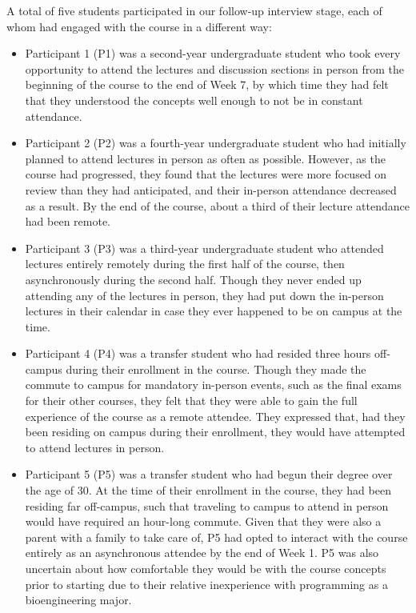 A total of five students participated in our follow-up interview stage, each of whom had engaged with the course in a different way:
\begin{itemize}
    \item Participant 1 (P1) was a second-year undergraduate student who took every opportunity to attend the lectures and discussion sections in person from the beginning of the course to the end of Week 7, by which time they had felt that they understood the concepts well enough to not be in constant attendance.
    \item Participant 2 (P2) was a fourth-year undergraduate student who had initially planned to attend lectures in person as often as possible. However, as the course had progressed, they found that the lectures were more focused on review than they had anticipated, and their in-person attendance decreased as a result. By the end of the course, about a third of their lecture attendance had been remote.
    \item Participant 3 (P3) was a third-year undergraduate student who attended lectures entirely remotely during the first half of the course, then asynchronously during the second half. Though they never ended up attending any of the lectures in person, they had put down the in-person lectures in their calendar in case they ever happened to be on campus at the time.
    \item Participant 4 (P4) was a transfer student who had resided three hours off-campus during their enrollment in the course. Though they made the commute to campus for mandatory in-person events, such as the final exams for their other courses, they felt that they were able to gain the full experience of the course as a remote attendee. They expressed that, had they been residing on campus during their enrollment, they would have attempted to attend lectures in person.
    \item Participant 5 (P5) was a transfer student who had begun their degree over the age of 30. At the time of their enrollment in the course, they had been residing far off-campus, such that traveling to campus to attend in person would have required an hour-long commute. Given that they were also a parent with a family to take care of, P5 had opted to interact with the course entirely as an asynchronous attendee by the end of Week 1. P5 was also uncertain about how comfortable they would be with the course concepts prior to starting due to their relative inexperience with programming as a bioengineering major.
\end{itemize}

